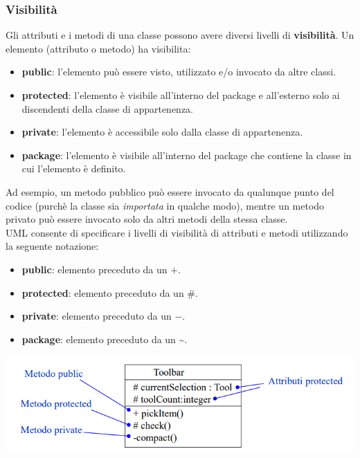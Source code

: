 \documentclass{article}
\begin{document}
	\subsubsection{Visibilità}
	Gli attributi e i metodi di una classe possono avere diversi livelli di \textbf{visibilità}. Un elemento (attributo o metodo) ha visibilita:
	\begin{itemize}
		\item \textbf{public}: l'elemento può essere visto, utilizzato e/o invocato da altre classi.
		\item \textbf{protected}: l'elemento è visibile all'interno del package e all'esterno solo ai discendenti della classe di appartenenza.
		\item \textbf{private}: l'elemento è accessibile solo dalla classe di appartenenza.
		\item \textbf{package}: l'elemento è visibile all'interno del package che contiene la classe in cui l'elemento è definito.
	\end{itemize}
	Ad esempio, un metodo pubblico può essere invocato da qualunque punto del codice (purchè la classe sia \textit{importata} in qualche modo), mentre un metodo privato può essere invocato solo da altri metodi della stessa classe.
	\vspace{\baselineskip} \\
	UML consente di specificare i livelli di visibilità di attributi e metodi utilizzando la seguente notazione:
	\begin{itemize}
		\item \textbf{public}: elemento preceduto da un $+$.
		\item \textbf{protected}: elemento preceduto da un \#.
		\item \textbf{private}: elemento preceduto da un $-$.
		\item \textbf{package}: elemento preceduto da un \textasciitilde.
	\end{itemize}
	\begin{center}
		\includegraphics[scale=0.6]{assets/uml_visibilita.png}
	\end{center}
\end{document}
